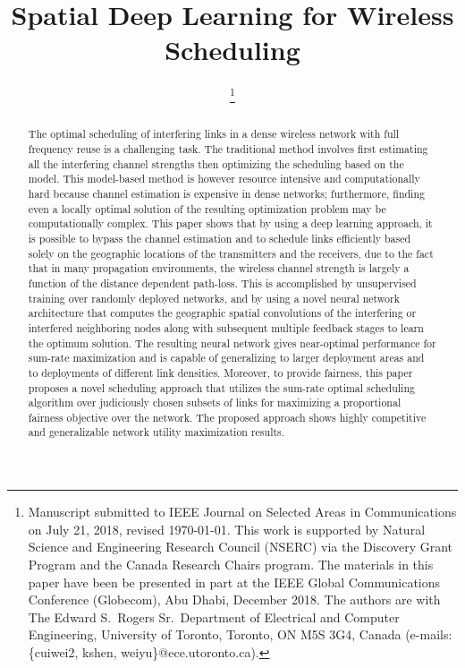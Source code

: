 \documentclass[journal,12pt,onecolumn,draftclsnofoot,]{IEEEtran}
\begin{document}
\title{Spatial Deep Learning for Wireless Scheduling}

\author{ %
\thanks{Manuscript submitted to IEEE Journal on Selected Areas in
Communications on July 21, 2018, revised \today.
This work is supported by Natural Science and Engineering Research Council
(NSERC) via the Discovery Grant Program and the Canada Research Chairs program.  The materials in this paper
have been be presented in part at the IEEE Global Communications Conference
(Globecom), Abu Dhabi, December 2018. The authors are with
The Edward S.~Rogers Sr.~Department of Electrical and Computer
Engineering, University of Toronto, Toronto, ON M5S 3G4, Canada
(e-mails: \{cuiwei2, kshen, weiyu\}@ece.utoronto.ca).}%
}




\maketitle


\begin{abstract}
The optimal scheduling of interfering links in a dense wireless network with
full frequency reuse is a challenging task. The traditional method involves
first estimating all the interfering channel strengths then optimizing the
scheduling based on the model. This model-based method is however resource
intensive and computationally hard because channel estimation is expensive 
in dense networks; furthermore, finding even a locally optimal solution of the
resulting optimization problem may be computationally complex. This paper shows
that by using a deep learning approach, it is possible to bypass the channel
estimation and to schedule links efficiently based solely on the geographic
locations of the transmitters and the receivers, due to the fact that in many propagation environments, the wireless channel strength is
largely a function of the distance dependent path-loss. This is accomplished 
by unsupervised training over randomly deployed networks, and 
by using a novel neural network
architecture that computes the geographic spatial convolutions of the interfering
or interfered neighboring nodes along with subsequent multiple feedback stages to learn
the optimum solution. The resulting neural network gives near-optimal
performance for sum-rate maximization and is capable of generalizing to larger
deployment areas and to deployments of different link densities. Moreover, to
provide fairness, this paper proposes a novel scheduling approach that utilizes
the sum-rate optimal scheduling algorithm over judiciously chosen subsets of
links for maximizing a proportional fairness objective over the network. The
proposed approach shows highly competitive and generalizable network utility
maximization results.
\end{abstract}
\end{document}

